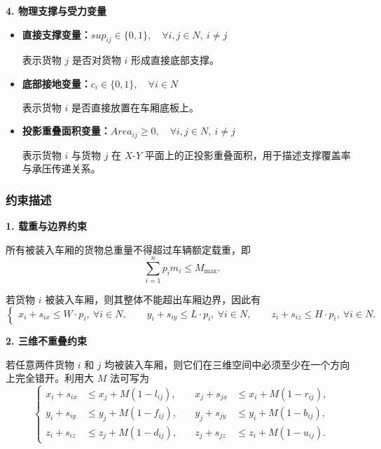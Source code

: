 \documentclass{MMCStyle}
\begin{document}
\noindent\textbf{4. 物理支撑与受力变量}

\begin{itemize}
\item \textbf{直接支撑变量：}$sup_{ij} \in \{0,1\}, \quad \forall i,j \in N,\ i \neq j$

表示货物 $j$ 是否对货物 $i$ 形成直接底部支撑。

\item \textbf{底部接地变量：}$c_i \in \{0,1\}, \quad \forall i \in N$

表示货物 $i$ 是否直接放置在车厢底板上。

\item \textbf{投影重叠面积变量：}$Area_{ij} \ge 0, \quad \forall i,j \in N,\ i \neq j$

表示货物 $i$ 与货物 $j$ 在 $X$-$Y$ 平面上的正投影重叠面积，用于描述支撑覆盖率与承压传递关系。
\end{itemize}

\subsubsection{约束描述}

\noindent\textbf{1. 载重与边界约束}

所有被装入车厢的货物总重量不得超过车辆额定载重，即
\begin{equation}
\sum_{i=1}^{n} p_i m_i \le M_{\max}.
\end{equation}

若货物 $i$ 被装入车厢，则其整体不能超出车厢边界，因此有
\begin{equation}
\left\{
\begin{aligned}
x_i+s_{ix}\le W\cdot p_i,\ \forall i\in N,\qquad
y_i+s_{iy}\le L\cdot p_i,\ \forall i\in N,\qquad
z_i+s_{iz}\le H\cdot p_i,\ \forall i\in N.
\end{aligned}
\right.
\end{equation}


\noindent\textbf{2. 三维不重叠约束}

若任意两件货物 $i$ 和 $j$ 均被装入车厢，则它们在三维空间中必须至少在一个方向上完全错开。利用大 $M$ 法可写为
\begin{equation}
\left\{
\begin{aligned}
x_i+s_{ix} &\le x_j+M(1-l_{ij}), &\quad
x_j+s_{jx} &\le x_i+M(1-r_{ij}),\\
y_i+s_{iy} &\le y_j+M(1-f_{ij}), &\quad
y_j+s_{jy} &\le y_i+M(1-b_{ij}),\\
z_i+s_{iz} &\le z_j+M(1-d_{ij}), &\quad
z_j+s_{jz} &\le z_i+M(1-u_{ij}).
\end{aligned}
\right.
\end{equation}
\end{document}
